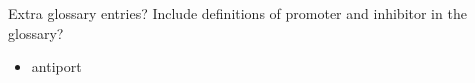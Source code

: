 \documentclass[newzealand,10pt,partial,onehalfspace,final]{aucklandthesis}
\theoremstyle{plain}
\begin{document}

\mainmatter
\makeatletter
\@mainmattertrue
\makeatother
\setcounter{secnumdepth}{\value{maxsecnumdepth}}


\begin{anfxwarning}{Extra glossary entries?}
Include definitions of promoter and inhibitor in the glossary?
\begin{itemize}
    \item antiport
\end{itemize}
\end{anfxwarning}

\glsresetall

\glsresetall

\glsresetall

\glsresetall

\glsresetall

\glsresetall

\glsresetall

\glsresetall


%
%
%

\backmatter

\cleardoublepage %

% 

\printbibliography[title={Works Cited}, heading=bibintoc]
\end{document}
